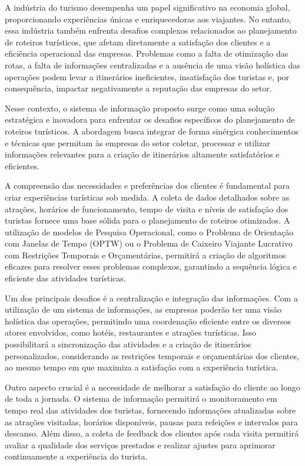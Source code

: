 A indústria do turismo desempenha um papel significativo na economia global, proporcionando experiências únicas e enriquecedoras aos viajantes. No entanto, essa indústria também enfrenta desafios complexos relacionados ao planejamento de roteiros turísticos, que afetam diretamente a satisfação dos clientes e a eficiência operacional das empresas. Problemas como a falta de otimização das rotas, a falta de informações centralizadas e a ausência de uma visão holística das operações podem levar a itinerários ineficientes, insatisfação dos turistas e, por consequência, impactar negativamente a reputação das empresas do setor.

Nesse contexto, o sistema de informação proposto surge como uma solução estratégica e inovadora para enfrentar os desafios específicos do planejamento de roteiros turísticos. A abordagem busca integrar de forma sinérgica conhecimentos e técnicas que permitam às empresas do setor coletar, processar e utilizar informações relevantes para a criação de itinerários altamente satisfatórios e eficientes.

A compreensão das necessidades e preferências dos clientes é fundamental para criar experiências turísticas sob medida. A coleta de dados detalhados sobre as atrações, horários de funcionamento, tempo de visita e níveis de satisfação dos turistas fornece uma base sólida para o planejamento de roteiros otimizados. A utilização de modelos de Pesquisa Operacional, como o Problema de Orientação com Janelas de Tempo (OPTW) ou o Problema de Caixeiro Viajante Lucrativo com Restrições Temporais e Orçamentárias, permitirá a criação de algoritmos eficazes para resolver esses problemas complexos, garantindo a sequência lógica e eficiente das atividades turísticas.

Um dos principais desafios é a centralização e integração das informações. Com a utilização de um sistema de informações, as empresas poderão ter uma visão holística das operações, permitindo uma coordenação eficiente entre os diversos atores envolvidos, como hotéis, restaurantes e atrações turísticas. Isso possibilitará a sincronização das atividades e a criação de itinerários personalizados, considerando as restrições temporais e orçamentárias dos clientes, ao mesmo tempo em que maximiza a satisfação com a experiência turística.

Outro aspecto crucial é a necessidade de melhorar a satisfação do cliente ao longo de toda a jornada. O sistema de informação permitirá o monitoramento em tempo real das atividades dos turistas, fornecendo informações atualizadas sobre as atrações visitadas, horários disponíveis, pausas para refeições e intervalos para descanso. Além disso, a coleta de feedback dos clientes após cada visita permitirá avaliar a qualidade dos serviços prestados e realizar ajustes para aprimorar continuamente a experiência do turista.

